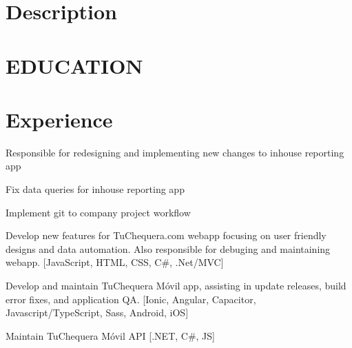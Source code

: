 \documentclass[]{deedy-resume-openfont}
\begin{document}
%
%
\lastupdated

%
%

\section{Description}

\section{EDUCATION}
\break
{}


\section{Experience}

\break
{} %
\begin{tightemize}
            \item Responsible for redesigning and implementing new changes to inhouse reporting app
          \item Fix data queries for inhouse reporting app
          \item Implement git to company project workflow
\end{tightemize}

\sectionsep

\break
{} %
\begin{tightemize}\item Develop new features for TuChequera.com webapp focusing on user friendly designs and data automation. Also responsible for debuging and maintaining webapp. [JavaScript, HTML, CSS, C\#, .Net/MVC]
                  \item Develop and maintain TuChequera Móvil app, assisting in update releases, build error fixes, and application QA. [Ionic, Angular, Capacitor, Javascript/TypeScript, Sass, Android, iOS]
                  \item Maintain TuChequera Móvil API [.NET, C\#, JS]
\end{tightemize}
\end{document}

